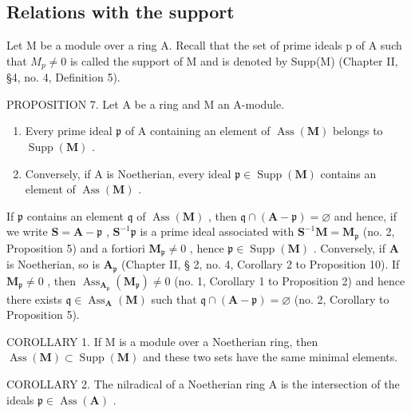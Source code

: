 \subsection{Relations with the support}

Let M be a module over a ring A. Recall that the set of prime ideals p of A such that \(M_{p} \neq 0\) is called the support of M and is denoted by Supp(M) (Chapter II, §4, no. 4, Definition 5).

PROPOSITION 7. Let A be a ring and M an A-module.

\begin{enumerate}
\def\labelenumi{(\roman{enumi})}
\item
  Every prime ideal \(\mathfrak{p}\) of A containing an element of \(\operatorname{Ass}(\mathbf{M})\) belongs to \(\operatorname{Supp}(\mathbf{M})\) .
\item
  Conversely, if A is Noetherian, every ideal \(\mathfrak{p} \in \operatorname{Supp}(\mathbf{M})\) contains an element of \(\operatorname{Ass}(\mathbf{M})\) .
\end{enumerate}

If \(\mathfrak{p}\) contains an element \(\mathfrak{q}\) of \(\operatorname{Ass}(\mathbf{M})\) , then \(\mathfrak{q} \cap (\mathbf{A} - \mathfrak{p}) = \varnothing\) and hence, if we write \(\mathbf{S} = \mathbf{A} - \mathfrak{p}\) , \(\mathbf{S}^{-1}\mathfrak{p}\) is a prime ideal associated with \(\mathbf{S}^{-1}\mathbf{M} = \mathbf{M}_{\mathfrak{p}}\) (no. 2, Proposition 5) and a fortiori \(\mathbf{M}_{\mathfrak{p}} \neq 0\) , hence \(\mathfrak{p} \in \operatorname{Supp}(\mathbf{M})\) . Conversely, if \(\mathbf{A}\) is Noetherian, so is \(\mathbf{A}_{\mathfrak{p}}\) (Chapter II, § 2, no. 4, Corollary 2 to Proposition 10). If \(\mathbf{M}_{\mathfrak{p}} \neq 0\) , then \(\operatorname{Ass}_{\mathbf{A}_{\mathfrak{p}}}(\mathbf{M}_{\mathfrak{p}}) \neq 0\) (no. 1, Corollary 1 to Proposition 2) and hence there exists \(\mathfrak{q} \in \operatorname{Ass}_{\mathbf{A}}(\mathbf{M})\) such that \(\mathfrak{q} \cap (\mathbf{A} - \mathfrak{p}) = \varnothing\) (no. 2, Corollary to Proposition 5).

COROLLARY 1. If M is a module over a Noetherian ring, then \(\operatorname{Ass}(\mathbf{M}) \subset \operatorname{Supp}(\mathbf{M})\) and these two sets have the same minimal elements.

COROLLARY 2. The nilradical of a Noetherian ring A is the intersection of the ideals \(\mathfrak{p} \in \operatorname{Ass}(\mathbf{A})\) .

